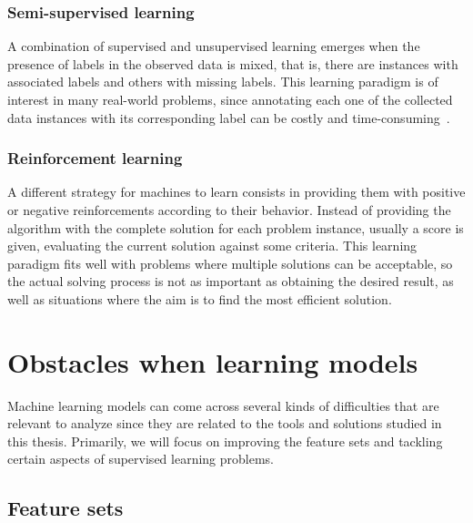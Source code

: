 \subsubsection{Semi-supervised learning}

A combination of supervised and unsupervised learning emerges when the presence of labels in the observed data is mixed, that is, there are instances with associated labels and others with missing labels. This learning paradigm is of interest in many real-world problems, since annotating each one of the collected data instances with its corresponding label can be costly and time-consuming~. 

\subsubsection{Reinforcement learning}

A different strategy for machines to learn consists in providing them with positive or negative reinforcements according to their behavior. Instead of providing the algorithm with the complete solution for each problem instance, usually a score is given, evaluating the current solution against some criteria. This learning paradigm fits well with problems where multiple solutions can be acceptable, so the actual solving process is not as important as obtaining the desired result, as well as situations where the aim is to find the most efficient solution.


\section{Obstacles when learning models}

Machine learning models can come across several kinds of difficulties that are relevant to analyze since they are related to the tools and solutions studied in this thesis. Primarily, we will focus on improving the feature sets and tackling certain aspects of supervised learning problems.

\subsection{Feature sets}


